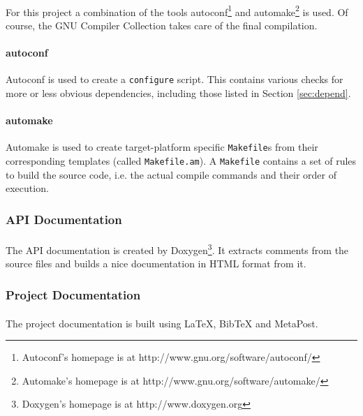 \paragraph{}
For this project a combination of the tools autoconf\footnote{Autoconf's homepage is at http://www.gnu.org/software/autoconf/} and automake\footnote{Automake's homepage is at http://www.gnu.org/software/automake/} is used. Of course, the GNU Compiler Collection  takes care of the final compilation.

\paragraph{autoconf}
Autoconf is used to create a \texttt{configure} script. This contains various checks for more or less obvious dependencies, including those listed in Section \ref{sec:depend}.

\paragraph{automake}
Automake is used to create target-platform specific \texttt{Makefile}s from their corresponding templates (called \texttt{Makefile.am}). A \texttt{Makefile} contains a set of rules to build the source code, i.e. the actual compile commands and their order of execution.

\subsubsection{API Documentation}
\paragraph{}
The API documentation is created by Doxygen\footnote{Doxygen's homepage is at http://www.doxygen.org}. It extracts comments from the source files and builds a nice documentation in HTML format from it.


\subsubsection{Project Documentation}
\paragraph{}
The project documentation is built using \LaTeX, BibTeX and MetaPost.

